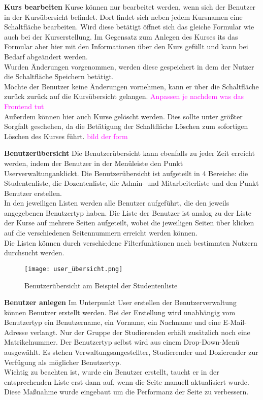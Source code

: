 \textbf{Kurs bearbeiten}
Kurse können nur bearbeitet werden, wenn sich der Benutzer in der Kursübersicht befindet. Dort findet sich neben jedem Kursnamen eine Schaltfläche \glqq bearbeiten\grqq . Wird diese betätigt öffnet sich das gleiche Formular wie auch bei der Kurserstellung. Im Gegensatz zum Anlegen des Kurses its das Formular aber hier mit den Informationen über den Kurs gefüllt und kann bei Bedarf abgeändert werden.\\
Wurden Änderungen vorgenommen, werden diese gespeichert in dem der Nutzer die Schaltfläche \glqq Speichern\grqq\: betätigt.\\
Möchte der Benutzer keine Änderungen vornehmen, kann er über die Schaltfläche \glqq zurück\grqq\: zurück auf die Kursübersicht gelangen. \textcolor{magenta}{Anpassen je nachdem was das Frontend tut}\\
Außerdem können hier auch Kurse gelöscht werden. Dies sollte unter größter Sorgfalt geschehen, da die Betätigung der Schaltfläche \glqq Löschen\grqq\: zum sofortigen Löschen des Kurses führt.
\textcolor{magenta}{bild der form}

\textbf{Benutzerübersicht}
Die Benutzerübersicht kann ebenfalls zu jeder Zeit erreicht werden, indem der Benutzer in der Menüleiste den Punkt \glqq Userverwaltung\grqq anklickt.
Die Benutzerübersicht ist aufgeteilt in 4 Bereiche: die Studentenliste, die Dozentenliste, die Admin- und Mitarbeiterliste und den Punkt Benutzer erstellen. \\
In den jeweiligen Listen werden alle Benutzer aufgeführt, die den jeweils angegebenen Benutzertyp haben. Die Liste der Benutzer ist analog zu der Liste der Kurse auf mehrere Seiten aufgeteilt, wobei die jeweiligen Seiten über klicken auf die verschiedenen Seitennummern erreicht werden können.\\
Die Listen können durch verschiedene Filterfunktionen nach bestimmten Nutzern durchsucht werden. 
\begin{figure}[h]
\centering
\texttt{[image: user\_übersicht.png]}
\caption{Benutzerübersicht am Beispiel der Studentenliste}
\label{fib:kü}
\end{figure}

\textbf{Benutzer anlegen}
Im Unterpunkt \glqq User erstellen\grqq\: der Benutzerverwaltung können Benutzer erstellt werden. Bei der Erstellung wird unabhängig vom Benutzertyp ein Benutzername, ein Vorname, ein Nachname und eine E-Mail-Adresse verlangt. Nur der Gruppe der Studierenden erhält zusätzlich noch eine Matrikelnummer. Der Benutzertyp selbst wird aus einem Drop-Down-Menü ausgewählt. Es stehen Verwaltungsangestellter, Studierender und Dozierender zur Verfügung als möglicher Benutzertyp. \\
Wichtig zu beachten ist, wurde ein Benutzer erstellt, taucht er in der entsprechenden Liste erst dann auf, wenn die Seite manuell aktualisiert wurde. Diese Maßnahme wurde eingebaut um die Performanz der Seite zu verbessern.

